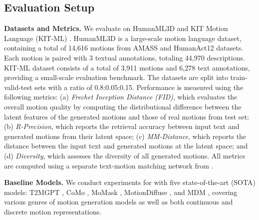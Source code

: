 \vspace{-3pt}
\subsection{Evaluation Setup}
\label{sub:eval_setup}
\vspace{-3pt}

\textbf{Datasets and Metrics.} 
We evaluate on HumanML3D \cite{Guo_2022_CVPR} and KIT Motion Language (KIT-ML) \cite{Plappert2016}.
HumanML3D is a large-scale motion language dataset, containing a total of 14,616 motions from AMASS \cite{mahmood2019amass} and HumanAct12 \cite{guo2020action2motion} datasets. 
Each motion is paired with 3 textual annotations, totaling 44,970
descriptions.
KIT-ML dataset consists of a total of 3,911 motions and 6,278 text annotations, providing a small-scale evaluation benchmark. 
The datasets are split into train-valid-test sets with a ratio of 0.8:0.05:0.15. 
Performance is measured using the following metrics: 
(a) \textit{Frechet Inception Distance (FID)}, which evaluates the overall motion quality by computing the distributional difference between the latent features of the generated motions and those of real motions from test set; 
(b) \textit{R-Precision}, which reports the retrieval accuracy between input text and generated motions from their latent space; 
(c) \textit{MM-Distance}, which reports the distance between the input text and generated motions at the latent space; and
(d) \textit{Diversity}, which assesses the diversity of all generated motions.
All metrics are computed using a separate text-motion matching network from \cite{Guo_2022_CVPR}.

\textbf{Baseline Models.} 
We conduct experiments for {\modulename} with five state-of-the-art (SOTA) models: 
T2MGPT \cite{zhang2023generating}, CoMo \cite{huang2024como}, MoMask \cite{guo2023momask},
MotionDiffuse \cite{zhang2022motiondiffuse}, 
and MDM \cite{tevet2023human}, covering various genres of motion generation models as well as both continuous and discrete motion representations.

